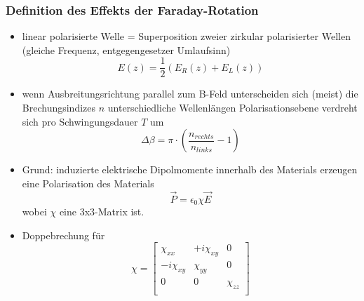 \subsubsection*{Definition des Effekts der Faraday-Rotation}
\begin{itemize}
    \item linear polarisierte Welle = Superposition zweier zirkular polarisierter Wellen (gleiche Frequenz, entgegengesetzer Umlaufsinn)
        \begin{equation*}
            E(z)=\frac{1}{2}(E_R(z)+E_L(z))    
        \end{equation*}
    \item wenn Ausbreitungsrichtung parallel zum B-Feld unterscheiden sich (meist) die Brechungsindizes $n$
        \to unterschiedliche Wellenlängen
        \iff Polarisationsebene verdreht sich pro Schwingungsdauer $T$ um 
        \begin{equation*}
            \Delta\beta=\pi\cdot\left(\frac{n_{rechts}}{n_{links}}-1\right)
        \end{equation*} 
    \item Grund: induzierte elektrische Dipolmomente innerhalb des Materials erzeugen eine Polarisation des Materials
        \begin{equation*}
            \vec{P}=\epsilon_0 \chi\vec{E}
        \end{equation*}
        wobei $\chi$ eine 3x3-Matrix ist.
    \item Doppebrechung für 
        \begin{equation*}
            \chi = \left[ 
            \begin{array}{ccc}
                \chi_{xx}          & +i\chi_{xy} & 0         \\ 
                -i\chi_{xy}   & \chi_{yy}        & 0         \\
                0                  & 0                & \chi_{zz} \\ 
            \end{array}
            \right]
        \end{equation*}
\end{itemize}

